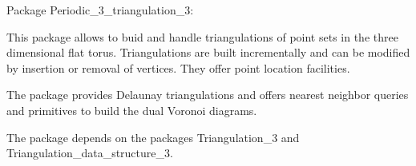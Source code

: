 Package Periodic_3_triangulation_3:

This package allows to buid and handle triangulations of point sets
in the three dimensional flat torus. Triangulations are built
incrementally and can be modified by insertion or removal of
vertices. They offer point location facilities.

The package provides Delaunay triangulations and offers nearest
neighbor queries and primitives to build the dual Voronoi diagrams.

The package depends on the packages Triangulation_3 and
Triangulation_data_structure_3.